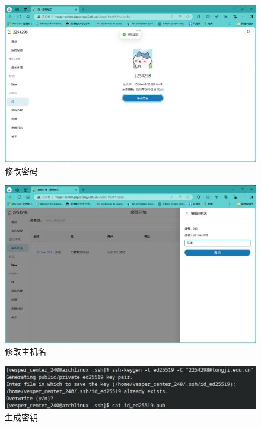 \begin{figure}[!htbp]
    \centering
    \includegraphics[scale=0.4]{fig/changeCode.png}
    \caption{修改密码}\label{changeCode}
\end{figure}
\begin{figure}[!htbp]
    \centering
    \includegraphics[scale=0.4]{fig/changeName.png}
    \caption{修改主机名}\label{changeName}
\end{figure}

\begin{figure}[!htbp]
    \centering
    \includegraphics[scale=0.7]{fig/genCode.png}
    \caption{生成密钥}\label{genCode}
\end{figure}

